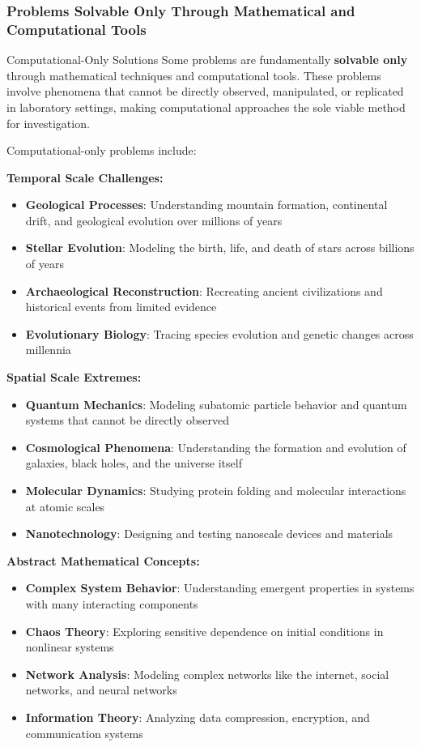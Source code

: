\subsubsection{Problems Solvable Only Through Mathematical and Computational Tools}

\begin{conceptcard}{Computational-Only Solutions}
Some problems are fundamentally \textbf{solvable only} through mathematical techniques and computational tools. These problems involve phenomena that cannot be directly observed, manipulated, or replicated in laboratory settings, making computational approaches the sole viable method for investigation.
\end{conceptcard}

Computational-only problems include:

\textbf{Temporal Scale Challenges:}
\begin{itemize}
    \item \textbf{Geological Processes}: Understanding mountain formation, continental drift, and geological evolution over millions of years
    \item \textbf{Stellar Evolution}: Modeling the birth, life, and death of stars across billions of years
    \item \textbf{Archaeological Reconstruction}: Recreating ancient civilizations and historical events from limited evidence
    \item \textbf{Evolutionary Biology}: Tracing species evolution and genetic changes across millennia
\end{itemize}

\textbf{Spatial Scale Extremes:}
\begin{itemize}
    \item \textbf{Quantum Mechanics}: Modeling subatomic particle behavior and quantum systems that cannot be directly observed
    \item \textbf{Cosmological Phenomena}: Understanding the formation and evolution of galaxies, black holes, and the universe itself
    \item \textbf{Molecular Dynamics}: Studying protein folding and molecular interactions at atomic scales
    \item \textbf{Nanotechnology}: Designing and testing nanoscale devices and materials
\end{itemize}

\textbf{Abstract Mathematical Concepts:}
\begin{itemize}
    \item \textbf{Complex System Behavior}: Understanding emergent properties in systems with many interacting components
    \item \textbf{Chaos Theory}: Exploring sensitive dependence on initial conditions in nonlinear systems
    \item \textbf{Network Analysis}: Modeling complex networks like the internet, social networks, and neural networks
    \item \textbf{Information Theory}: Analyzing data compression, encryption, and communication systems
\end{itemize}

